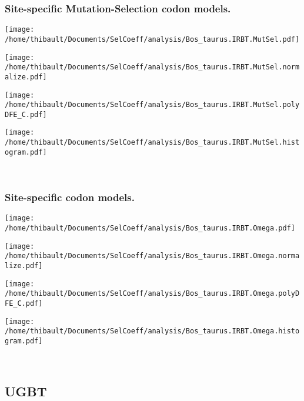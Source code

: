 \subsubsection*{Site-specific Mutation-Selection codon models.} 
\begin{minipage}{0.49\linewidth} 
\texttt{[image: /home/thibault/Documents/SelCoeff/analysis/Bos\_taurus.IRBT.MutSel.pdf]} 
\end{minipage}
\begin{minipage}{0.49\linewidth} 
\texttt{[image: /home/thibault/Documents/SelCoeff/analysis/Bos\_taurus.IRBT.MutSel.normalize.pdf]} 
\end{minipage}
\begin{minipage}{0.49\linewidth} 
\texttt{[image: /home/thibault/Documents/SelCoeff/analysis/Bos\_taurus.IRBT.MutSel.polyDFE\_C.pdf]} 
\end{minipage}
\begin{minipage}{0.49\linewidth} 
\texttt{[image: /home/thibault/Documents/SelCoeff/analysis/Bos\_taurus.IRBT.MutSel.histogram.pdf]} 
\end{minipage}
\\ 
\subsubsection*{Site-specific codon models.} 
\begin{minipage}{0.49\linewidth} 
\texttt{[image: /home/thibault/Documents/SelCoeff/analysis/Bos\_taurus.IRBT.Omega.pdf]} 
\end{minipage}
\begin{minipage}{0.49\linewidth} 
\texttt{[image: /home/thibault/Documents/SelCoeff/analysis/Bos\_taurus.IRBT.Omega.normalize.pdf]} 
\end{minipage}
\begin{minipage}{0.49\linewidth} 
\texttt{[image: /home/thibault/Documents/SelCoeff/analysis/Bos\_taurus.IRBT.Omega.polyDFE\_C.pdf]} 
\end{minipage}
\begin{minipage}{0.49\linewidth} 
\texttt{[image: /home/thibault/Documents/SelCoeff/analysis/Bos\_taurus.IRBT.Omega.histogram.pdf]} 
\end{minipage}
\\ 
\subsection{UGBT} 
 

